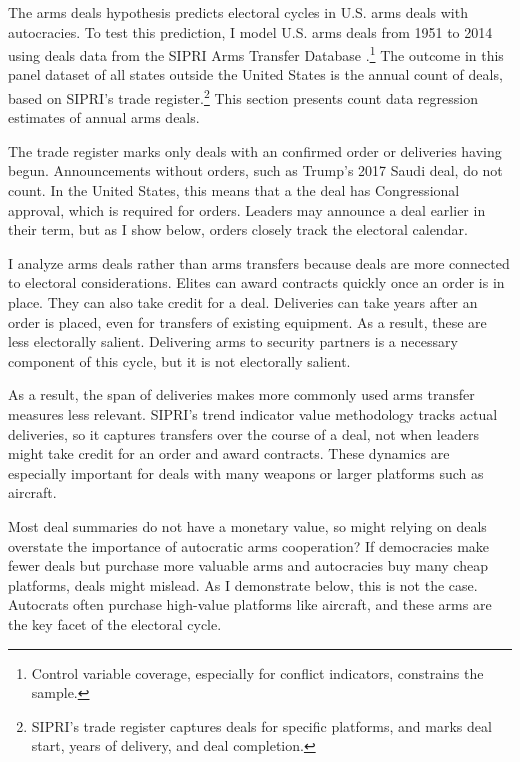 \documentclass[12pt]{article}
\begin{document}
The arms deals hypothesis predicts electoral cycles in U.S. arms deals with autocracies.
To test this prediction, I model U.S. arms deals from 1951 to 2014 using deals data from the SIPRI Arms Transfer Database \citep{SIPRI2021}.\footnote{Control variable coverage, especially for conflict indicators, constrains the sample.}
The outcome in this panel dataset of all states outside the United States is the annual count of deals, based on SIPRI's trade register.\footnote{SIPRI's trade register captures deals for specific platforms, and marks deal start, years of delivery, and deal completion.}
This section presents count data regression estimates of annual arms deals. 


The trade register marks only deals with an confirmed order or deliveries having begun. 
Announcements without orders, such as Trump's 2017 Saudi deal, do not count. 
In the United States, this means that a the deal has Congressional approval, which is required for orders. 
Leaders may announce a deal earlier in their term, but as I show below, orders closely track the electoral calendar. 


I analyze arms deals rather than arms transfers because deals are more connected to electoral considerations.
Elites can award contracts quickly once an order is in place.
They can also take credit for a deal. 
 Deliveries can take years after an order is placed, even for transfers of existing equipment. 
As a result, these are less electorally salient. 
Delivering arms to security partners is a necessary component of this cycle, but it is not electorally salient. 


As a result, the span of deliveries makes more commonly used arms transfer measures less relevant.
SIPRI's trend indicator value methodology tracks actual deliveries, so it captures transfers over the course of a deal, not when leaders might take credit for an order and award contracts.
These dynamics are especially important for deals with many weapons or larger platforms such as aircraft. 


Most deal summaries do not have a monetary value, so might relying on deals overstate the importance of autocratic arms cooperation? 
If democracies make fewer deals but purchase more valuable arms and autocracies buy many cheap platforms, deals might mislead. 
As I demonstrate below, this is not the case. 
Autocrats often purchase high-value platforms like aircraft, and these arms are the key facet of the electoral cycle. 
\end{document}
